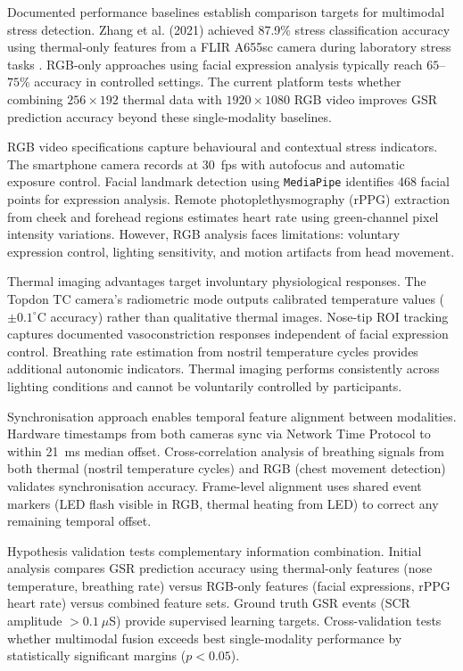 \documentclass{report}
\begin{document}
    Documented performance baselines establish comparison targets for multimodal stress detection. Zhang et al. (2021) achieved 87.9\% stress classification accuracy using thermal-only features from a FLIR A655sc camera during laboratory stress tasks \cite{zhang2021}. RGB-only approaches using facial expression analysis typically reach $65$--$75$\% accuracy in controlled settings. The current platform tests whether combining $256 \times 192$ thermal data with $1920 \times 1080$ RGB video improves GSR prediction accuracy beyond these single-modality baselines.

    RGB video specifications capture behavioural and contextual stress indicators. The smartphone camera records at 30~fps with autofocus and automatic exposure control. Facial landmark detection using \texttt{MediaPipe} identifies 468 facial points for expression analysis. Remote photoplethysmography (rPPG) extraction from cheek and forehead regions estimates heart rate using green-channel pixel intensity variations. However, RGB analysis faces limitations: voluntary expression control, lighting sensitivity, and motion artifacts from head movement.

    Thermal imaging advantages target involuntary physiological responses. The Topdon TC camera's radiometric mode outputs calibrated temperature values ($\pm 0.1^{\circ}$C accuracy) rather than qualitative thermal images. Nose-tip ROI tracking captures documented vasoconstriction responses independent of facial expression control. Breathing rate estimation from nostril temperature cycles provides additional autonomic indicators. Thermal imaging performs consistently across lighting conditions and cannot be voluntarily controlled by participants.

    Synchronisation approach enables temporal feature alignment between modalities. Hardware timestamps from both cameras sync via Network Time Protocol to within 21~ms median offset. Cross-correlation analysis of breathing signals from both thermal (nostril temperature cycles) and RGB (chest movement detection) validates synchronisation accuracy. Frame-level alignment uses shared event markers (LED flash visible in RGB, thermal heating from LED) to correct any remaining temporal offset.

    Hypothesis validation tests complementary information combination. Initial analysis compares GSR prediction accuracy using thermal-only features (nose temperature, breathing rate) versus RGB-only features (facial expressions, rPPG heart rate) versus combined feature sets. Ground truth GSR events (SCR amplitude $>0.1~\mu$S) provide supervised learning targets. Cross-validation tests whether multimodal fusion exceeds best single-modality performance by statistically significant margins ($p < 0.05$).
\end{document}
